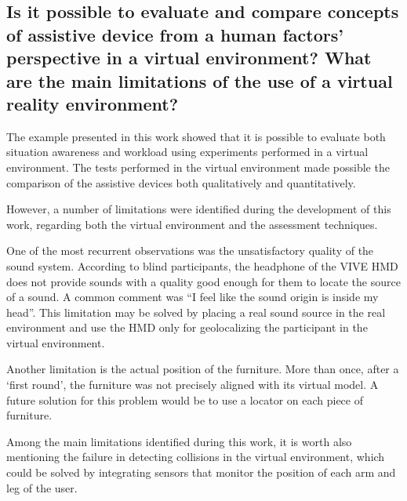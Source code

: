 

\subsection*{Is it possible to evaluate and compare concepts of assistive device from a human factors’ perspective in a virtual environment? What are the main limitations of the use of a virtual reality environment?
}

The example presented in this work showed that it is possible to evaluate both situation awareness and workload using experiments performed in a virtual environment. The tests performed in the virtual environment made possible the comparison of the assistive devices both qualitatively and quantitatively.

However, a number of limitations were identified during the development of this work, regarding both the virtual environment and the assessment techniques.

One of the most recurrent observations was the unsatisfactory quality of the sound system. According to blind participants, the headphone of the VIVE HMD does not provide sounds with a quality good enough for them to locate the source of a sound. A common comment was “I feel like the sound origin is inside my head”. This limitation may be solved by placing a real sound source in the real environment and use the HMD only for geolocalizing the participant in the virtual environment.

Another limitation is the actual position of the furniture. More than once, after a ‘first round’, the furniture was not precisely aligned with its virtual model. A future solution for this problem would be to use a locator on each piece of furniture.

Among the main limitations identified during this work, it is worth also mentioning the failure in detecting collisions in the virtual environment, which could be solved by integrating sensors that monitor the position of each arm and leg of the user.


